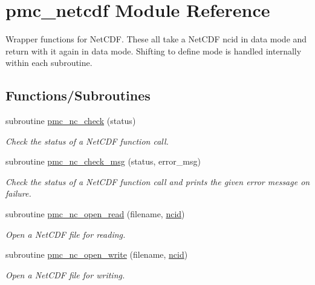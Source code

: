 \hypertarget{namespacepmc__netcdf}{}\section{pmc\+\_\+netcdf Module Reference}
\label{namespacepmc__netcdf}


Wrapper functions for Net\+C\+DF. These all take a Net\+C\+DF {\ttfamily ncid} in data mode and return with it again in data mode. Shifting to define mode is handled internally within each subroutine.  


\subsection*{Functions/\+Subroutines}
\begin{DoxyCompactItemize}
\item 
subroutine \mbox{\hyperlink{namespacepmc__netcdf_aeb26885b57dbc718ca9d8a8d4cc1660b}{pmc\+\_\+nc\+\_\+check}} (status)
\begin{DoxyCompactList}\small\item\em Check the status of a Net\+C\+DF function call. \end{DoxyCompactList}\item 
subroutine \mbox{\hyperlink{namespacepmc__netcdf_a44641c8551b43500185faf232a8b743f}{pmc\+\_\+nc\+\_\+check\+\_\+msg}} (status, error\+\_\+msg)
\begin{DoxyCompactList}\small\item\em Check the status of a Net\+C\+DF function call and prints the given error message on failure. \end{DoxyCompactList}\item 
subroutine \mbox{\hyperlink{namespacepmc__netcdf_ac9ac86c766cac059b77fb52305ef7258}{pmc\+\_\+nc\+\_\+open\+\_\+read}} (filename, \mbox{\hyperlink{fractal_8_f90_a4e89f3f850921ff84a6dfce8b166ad50}{ncid}})
\begin{DoxyCompactList}\small\item\em Open a Net\+C\+DF file for reading. \end{DoxyCompactList}\item 
subroutine \mbox{\hyperlink{namespacepmc__netcdf_a10b4e36fc32903e45fad5a03e01cdeb2}{pmc\+\_\+nc\+\_\+open\+\_\+write}} (filename, \mbox{\hyperlink{fractal_8_f90_a4e89f3f850921ff84a6dfce8b166ad50}{ncid}})
\begin{DoxyCompactList}\small\item\em Open a Net\+C\+DF file for writing. \end{DoxyCompactList}\item 

\end{DoxyCompactItemize}
